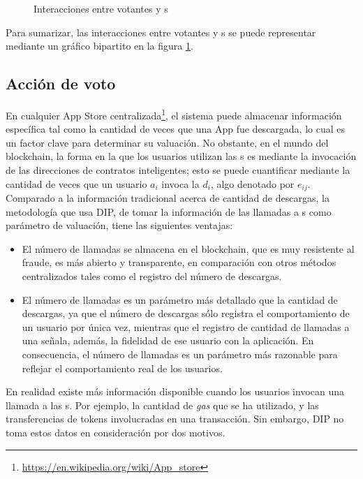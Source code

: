    \begin{figure}
   	\centering
   	
   	\caption{Interacciones entre votantes y {\dapp}s \label{fig:interact}}
   \end{figure}
  Para sumarizar, las interacciones entre votantes y {\dapp}s se puede representar mediante un gráfico bipartito en la figura \ref{fig:interact}.

 \subsection{Acción de voto}
 \label{subsection:voting}
 \noindent
  En cualquier App Store centralizada\footnote{\url{https://en.wikipedia.org/wiki/App\_store}}, el sistema puede almacenar información específica tal como la cantidad de veces que una App fue descargada, lo cual es un factor clave para determinar su valuación. No obstante, en el mundo del blockchain, la forma en la que los usuarios utilizan las {\dapp}s es mediante la invocación de las direcciones de contratos inteligentes; esto se puede cuantificar mediante la cantidad de veces que un usuario $a_i$ invoca la \dapp $d_i$, algo denotado por $e_{ij}$. Comparado a la información tradicional acerca de cantidad de descargas, la metodología que usa DIP, de tomar la información de las llamadas a {\dapp}s como parámetro de valuación, tiene las siguientes ventajas:

 \begin{itemize}
 	\item El número de llamadas se almacena en el blockchain, que es muy resistente al fraude, es más abierto y transparente, en comparación con otros métodos centralizados tales como el registro del número de descargas.
 	\item El número de llamadas es un parámetro más detallado que la cantidad de descargas, ya que el número de descargas sólo registra el comportamiento de un usuario por única vez, mientras que el registro de cantidad de llamadas a una \dapp señala, además, la fidelidad de ese usuario con la aplicación. En consecuencia, el número de llamadas es un parámetro más razonable para reflejar el comportamiento real de los usuarios.

\end{itemize}

 En realidad existe más información disponible cuando los usuarios invocan una llamada a las {\dapp}s. Por ejemplo, la cantidad de \textit{gas} que se ha utilizado, y las transferencias de tokens involucradas en una transacción. Sin embargo, DIP no toma estos datos en consideración por dos motivos.

